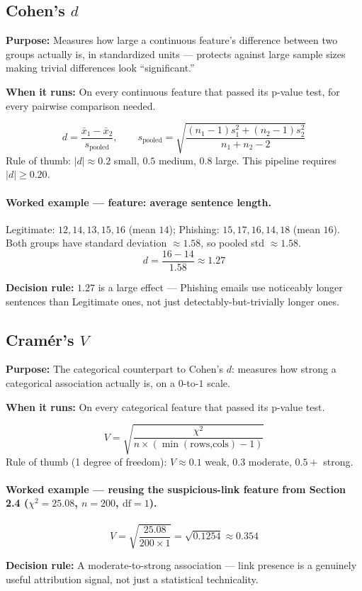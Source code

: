 \documentclass[11pt]{article}
\newcommand{\purpose}[1]{\par\noindent\textbf{Purpose:} #1\par}
\newcommand{\whenrun}[1]{\par\noindent\textbf{When it runs:} #1\par}
\newcommand{\decision}[1]{\par\noindent\textbf{Decision rule:} #1\par}
\begin{document}
\subsection{Cohen's $d$}
\purpose{Measures how large a continuous feature's difference between two groups actually is, in
standardized units --- protects against large sample sizes making trivial differences look
``significant.''}
\whenrun{On every continuous feature that passed its p-value test, for every pairwise comparison
needed.}

\[
d = \frac{\bar{x}_1-\bar{x}_2}{s_{\text{pooled}}}, \qquad
s_{\text{pooled}} = \sqrt{\frac{(n_1-1)s_1^2+(n_2-1)s_2^2}{n_1+n_2-2}}
\]
Rule of thumb: $|d|\approx0.2$ small, $0.5$ medium, $0.8$ large. This pipeline requires $|d|\geq0.20$.

\paragraph{Worked example --- feature: average sentence length.}
Legitimate: $12,14,13,15,16$ (mean $14$); Phishing: $15,17,16,14,18$ (mean $16$). Both groups have
standard deviation $\approx1.58$, so pooled std $\approx1.58$.
\[
d = \frac{16-14}{1.58} \approx 1.27
\]
\decision{$1.27$ is a large effect --- Phishing emails use noticeably longer sentences than Legitimate
ones, not just detectably-but-trivially longer ones.}

\subsection{Cram\'er's $V$}
\purpose{The categorical counterpart to Cohen's $d$: measures how strong a categorical association
actually is, on a $0$-to-$1$ scale.}
\whenrun{On every categorical feature that passed its p-value test.}

\[
V = \sqrt{\frac{\chi^2}{n\times(\min(\text{rows,cols})-1)}}
\]
Rule of thumb (1 degree of freedom): $V\approx0.1$ weak, $0.3$ moderate, $0.5+$ strong.

\paragraph{Worked example --- reusing the suspicious-link feature from Section 2.4 ($\chi^2=25.08$,
$n=200$, $\mathrm{df}=1$).}
\[
V = \sqrt{\frac{25.08}{200\times1}} = \sqrt{0.1254} \approx 0.354
\]
\decision{A moderate-to-strong association --- link presence is a genuinely useful attribution signal,
not just a statistical technicality.}
\end{document}
